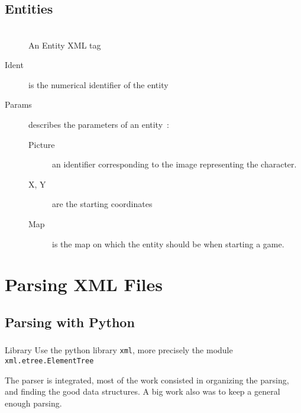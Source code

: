 \documentclass[a4paper, 11pt]{beamer}
\begin{document}
\subsection{Entities}

\begin{frame}
    \frametitle{\subsecname}
    \begin{figure}
        \begin{adjustwidth}{0.1\textwidth}{}
            \scriptsize{\inputminted{xml}{test_files/entity.xml}}
        \end{adjustwidth}
        \caption{An Entity XML tag}
    \end{figure}
    \begin{small}
        \begin{adjustwidth}{-0.1\textwidth}{}
            \begin{description}
                \item[Ident] is the numerical identifier of the entity
                \item[Params] describes the parameters of an entity~:
                    \begin{description}
                        \item[Picture] an identifier corresponding to the image
                            representing the character.
                        \item[X, Y] are the starting coordinates
                        \item[Map] is the map on which the entity should be
                            when starting a game.
                    \end{description}
            \end{description}
        \end{adjustwidth}
    \end{small}
\end{frame}

\section{Parsing XML Files}

\subsection{Parsing with Python}

\begin{frame}[fragile]
    \frametitle{\subsecname}
    \begin{block}{Library}
        Use the python library \verb|xml|, more precisely
        the module \verb|xml.etree.ElementTree|
    \end{block}
    The parser is integrated, most of the work consisted in organizing
    the parsing, and finding the good data structures.
    A big work also was to keep a general enough parsing.
\end{frame}
\end{document}
